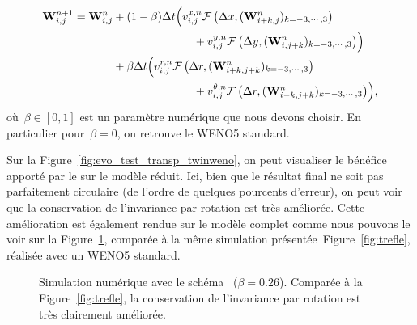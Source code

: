 \documentclass[main.tex]{subfiles}
\begin{document}
\begin{equation}\label{eq:twin-WENO5}
  \begin{split}
\W^{n+1}_{i,j} =\W^n_{i,j} &+ (1-\beta)\Delta t \Bigl(v_{i,j}^{x,n}
\mathcal{F}\left(\Delta x,(\W^n_{i+k,j})_{k=-3,\cdots, 3}\right) \\
&\hspace{25mm} + v_{i,j}^{y,n} \mathcal{F}\left(\Delta y,(\W^n_{i,j+k})_{k=-3,\cdots,3}\right)\Bigr)\\
&+\beta\Delta t \Bigl(v_{i,j}^{r,n}
\mathcal{F}\left(\Delta r,(\W^n_{i+k,j+k})_{k=-3,\cdots, 3}\right) \\
& \hspace{25mm} + v_{i,j}^{\theta,n} \mathcal{F}\left(\Delta r,(\W^n_{i-k,j+k})_{k=-3,\cdots, 3}\right)\Bigr),
  \end{split}
\end{equation}
où~$\beta\in[0,1]$ est un paramètre numérique que nous devons choisir. 
En particulier pour~$\beta=0$, on retrouve le WENO5 standard. 


Sur la Figure~\ref{fig:evo_test_transp_twinweno}, on peut visualiser le bénéfice apporté par le \twinweno sur le modèle réduit. Ici, bien que le résultat final ne soit pas parfaitement circulaire (de l'ordre de quelques pourcents d'erreur), on peut voir que la conservation de l'invariance par rotation est très améliorée. Cette amélioration est également rendue sur le modèle complet comme nous pouvons le voir sur la Figure~\ref{fig:compWENO5}, comparée à la même simulation présentée~Figure~\ref{fig:trefle}, réalisée avec un WENO5 standard.

\begin{figure}[!htb]
\vspace{-5mm}
\centering
{}
\caption{Simulation numérique avec le schéma \twinweno\  ($\beta=0.26$).  
Comparée à la Figure~\ref{fig:trefle}, la conservation de l'invariance par rotation est très clairement améliorée. 
}\label{fig:compWENO5}
\end{figure}
\end{document}
